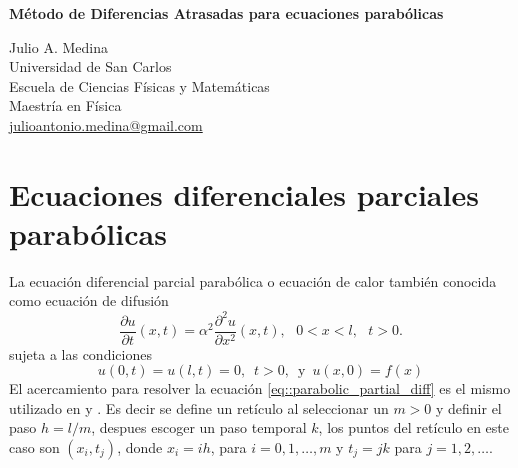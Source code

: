 \documentclass[a4paper]{article}
\begin{document}

\Large
 \begin{center}
\textbf{Método de Diferencias Atrasadas para ecuaciones parabólicas}\\


\hspace{10pt}

\large
Julio A. Medina\\
\hspace{10pt}
\small  
Universidad de San Carlos\\
Escuela de Ciencias Físicas y Matemáticas\\
Maestría en Física\\
\href{mailto:julioantonio.medina@gmail.com}{julioantonio.medina@gmail.com}\\

\end{center}

\hspace{10pt}

\normalsize
\section{Ecuaciones diferenciales parciales parabólicas}
La ecuación diferencial parcial parabólica o ecuación de calor también conocida como ecuación de difusión
\begin{equation}\label{eq::parabolic_partial_diff}
\frac{\partial u}{\partial t}(x,t) = \alpha^2 \frac{\partial^2 u}{\partial x^2}(x,t),\,\,\,\, 0<x<l, \,\,\,\, t>0.
\end{equation}
sujeta a las condiciones
\begin{equation}
u(0,t)=u(l,t)=0,\,\,\, t>0, \,\,\,\text{y}\,\,\, u(x,0)=f(x)
\end{equation}
El acercamiento para resolver la ecuación \ref{eq::parabolic_partial_diff} es el mismo utilizado en \cite{Medina} y \cite{Burden}. Es decir se define un retículo al seleccionar un $m>0$ y definir el paso $h=l/m$, despues escoger un paso temporal $k$, los puntos del retículo en este caso son $(x_i, t_j)$, donde $x_i=ih$, para $i=0,1,\hdots,m$ y $t_j=jk$ para $j=1,2,\hdots$. 
\end{document}
